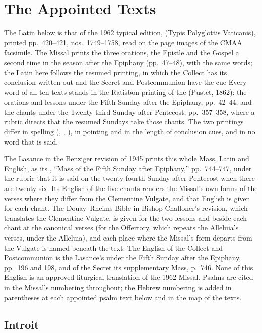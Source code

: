 \section{The Appointed Texts}
\label{sec:appointed-texts}

The Latin below is that of the 1962 typical edition, 
(Typis Polyglottis Vaticanis), printed pp.~420--421, nos.~1749--1758, read on
the page images of the CMAA facsimile. The Missal prints the three orations,
the Epistle and the Gospel a second time in the season after the Epiphany
(pp.~47--48), with the same words; the Latin here follows the resumed
printing, in which the Collect has its conclusion written out and the Secret
and Postcommunion have the cue  Every word of all ten
texts stands in the Ratisbon printing of the  (Pustet,
1862): the orations and lessons under the Fifth Sunday after the Epiphany,
pp.~42--44, and the chants under the Twenty-third Sunday after Pentecost,
pp.~357--358, where a rubric directs that the resumed Sundays take those
chants. The two printings differ in spelling (, ,
), in pointing and in the length of conclusion cues, and in
no word that is said.

The Lasance  in the Benziger revision of 1945 prints
this whole Mass, Latin and English, as its ,
``Mass of the Fifth Sunday after Epiphany,'' pp.~744--747, under the rubric
that it is said on the twenty-fourth Sunday after Pentecost when there are
twenty-six. Its English of the five chants renders the Missal's own forms of
the verses where they differ from the Clementine Vulgate, and that English
is given for each chant. The Douay--Rheims Bible in Bishop
Challoner's revision, which translates the Clementine Vulgate, is given for
the two lessons and beside each chant at the canonical verses (for the
Offertory, which repeats the Alleluia's verses, under the Alleluia), and each place
where the Missal's form departs from the Vulgate is named beneath the text.
The English of the Collect and Postcommunion is the Lasance's under the Fifth
Sunday after the Epiphany, pp.~196 and 198, and of the Secret its
supplementary Mass, p.~746. None of this English is an approved liturgical
translation of the 1962 Missal. Psalms are cited in the Missal's numbering
throughout; the Hebrew numbering is added in parentheses at each appointed
psalm text below and in the map of the texts.

\subsection{Introit}
\label{proper-introit}

